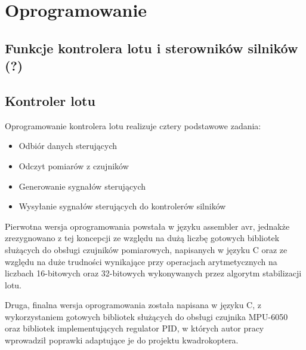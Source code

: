 
\chapter{Oprogramowanie} %

\label{Chapter6} %



\section{Funkcje kontrolera lotu i sterowników silników (?)}


\section{Kontroler lotu}

Oprogramowanie kontrolera lotu realizuje cztery podstawowe zadania:

\begin{itemize}
	\item Odbiór danych sterujących 
	\item Odczyt pomiarów z czujników
	\item Generowanie sygnałów sterujących 
	\item Wysyłanie sygnałów sterujących do kontrolerów silników
\end{itemize}

Pierwotna wersja oprogramowania powstała w języku assembler avr, jednakże zrezygnowano z tej koncepcji ze względu na dużą liczbę gotowych bibliotek służących do obsługi czujników pomiarowych, napisanych w języku C oraz ze względu na duże trudności wynikające przy operacjach arytmetycznych na liczbach 16-bitowych oraz 32-bitowych wykonywanych przez algorytm stabilizacji lotu. 

Druga, finalna wersja oprogramowania została napisana w języku C, z wykorzystaniem gotowych bibliotek służących do obsługi czujnika MPU-6050 oraz bibliotek implementujących regulator PID, w których autor pracy wprowadził poprawki adaptujące je do projektu kwadrokoptera.


